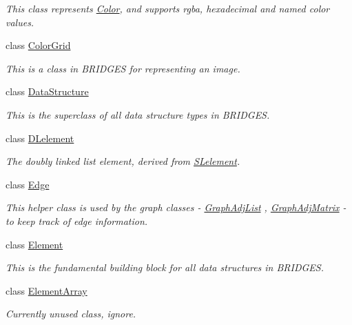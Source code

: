 \begin{DoxyCompactItemize}
\begin{DoxyCompactList}\small\item\em This class represents \hyperlink{classbridges_1_1datastructure_1_1_color}{Color}, and supports rgba, hexadecimal and named color values. \end{DoxyCompactList}\item 
class \hyperlink{classbridges_1_1datastructure_1_1_color_grid}{Color\+Grid}
\begin{DoxyCompactList}\small\item\em This is a class in B\+R\+I\+D\+G\+ES for representing an image. \end{DoxyCompactList}\item 
class \hyperlink{classbridges_1_1datastructure_1_1_data_structure}{Data\+Structure}
\begin{DoxyCompactList}\small\item\em This is the superclass of all data structure types in B\+R\+I\+D\+G\+ES. \end{DoxyCompactList}\item 
class \hyperlink{classbridges_1_1datastructure_1_1_d_lelement}{D\+Lelement}
\begin{DoxyCompactList}\small\item\em The doubly linked list element, derived from \hyperlink{classbridges_1_1datastructure_1_1_s_lelement}{S\+Lelement}. \end{DoxyCompactList}\item 
class \hyperlink{classbridges_1_1datastructure_1_1_edge}{Edge}
\begin{DoxyCompactList}\small\item\em This helper class is used by the graph classes -\/ \hyperlink{classbridges_1_1datastructure_1_1_graph_adj_list}{Graph\+Adj\+List} , \hyperlink{classbridges_1_1datastructure_1_1_graph_adj_matrix}{Graph\+Adj\+Matrix} -\/ to keep track of edge information. \end{DoxyCompactList}\item 
class \hyperlink{classbridges_1_1datastructure_1_1_element}{Element}
\begin{DoxyCompactList}\small\item\em This is the fundamental building block for all data structures in B\+R\+I\+D\+G\+ES. \end{DoxyCompactList}\item 
class \hyperlink{classbridges_1_1datastructure_1_1_element_array}{Element\+Array}
\begin{DoxyCompactList}\small\item\em Currently unused class, ignore. \end{DoxyCompactList}\item 

\end{DoxyCompactItemize}
